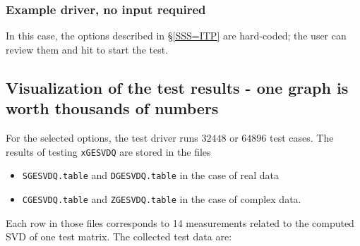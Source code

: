 \documentclass[12pt, a4paper, final]{article}
\numberwithin{equation}{section}
\begin{document}
\subsubsection{Example driver, no input required}

In this case, the options described in \S \ref{SSS=ITP} are hard-coded;
the user can review them and hit  to start the test.

\subsection{Visualization of the test results - one graph is worth thousands of numbers}
For the selected options, the test driver runs $32448$ or $64896$ test cases. The results of testing \texttt{xGESVDQ} are stored in the files
\begin{itemize}
\item \texttt{SGESVDQ.table} and \texttt{DGESVDQ.table} in the case of real data
\item \texttt{CGESVDQ.table} and \texttt{ZGESVDQ.table} in the case of complex data.	
\end{itemize} 
Each row in those files corresponds to 14 measurements related to the computed SVD of one test matrix. The collected test data are:
\end{document}
